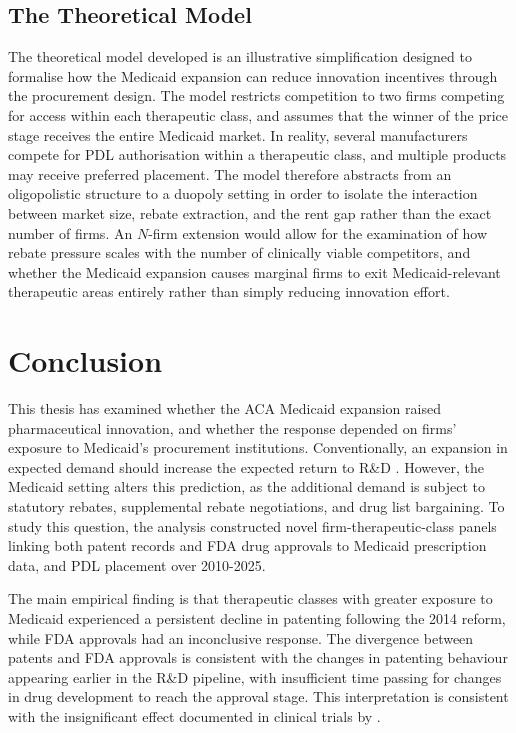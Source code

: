\documentclass[12pt]{article}
\begin{document}
\subsection{The Theoretical Model}

The theoretical model developed is an illustrative simplification designed to formalise how the Medicaid expansion can reduce innovation incentives through the procurement design. The model restricts competition to two firms competing for access within each therapeutic class, and assumes that the winner of the price stage receives the entire Medicaid market. In reality, several manufacturers compete for PDL authorisation within a therapeutic class, and multiple products may receive preferred placement. The model therefore abstracts from an oligopolistic structure to a duopoly setting in order to isolate the interaction between market size, rebate extraction, and the rent gap rather than the exact number of firms. An $N$-firm extension would allow for the examination of how rebate pressure scales with the number of clinically viable competitors, and whether the Medicaid expansion causes marginal firms to exit Medicaid-relevant therapeutic areas entirely rather than simply reducing innovation effort.

\clearpage

\section{Conclusion}

This thesis has examined whether the ACA Medicaid expansion raised pharmaceutical innovation, and whether the response depended on firms' exposure to Medicaid's procurement institutions. Conventionally, an expansion in expected demand should increase the expected return to R\&D \citep{finkelstein2004static, dubois2015market}. However, the Medicaid setting alters this prediction, as the additional demand is subject to statutory rebates, supplemental rebate negotiations, and drug list bargaining. To study this question, the analysis constructed novel firm-therapeutic-class panels linking both patent records and FDA drug approvals to Medicaid prescription data, and PDL placement over 2010-2025.

The main empirical finding is that therapeutic classes with greater exposure to Medicaid experienced a persistent decline in patenting following the 2014 reform, while FDA approvals had an inconclusive response. The divergence between patents and FDA approvals is consistent with the changes in patenting behaviour appearing earlier in the R\&D pipeline, with insufficient time passing for changes in drug development to reach the approval stage. This interpretation is consistent with the insignificant effect documented in clinical trials by \citet{NBERw28755}.
\end{document}
